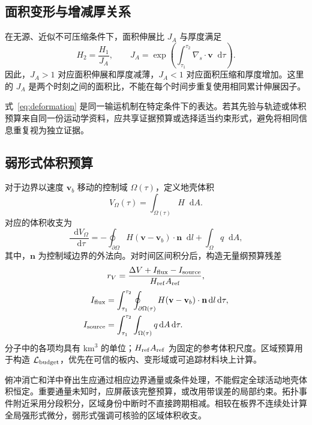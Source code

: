 \documentclass[UTF8,zihao=-4,fontset=none,a4paper]{ctexart}
\newcommand{\dif}{\mathop{}\!\mathrm{d}}
\newcommand{\divs}{\nabla_s\!\cdot}
\newcommand{\loss}{\mathcal{L}}
\begin{document}
\subsection{面积变形与增减厚关系}

在无源、近似不可压缩条件下，面积伸展比 $J_A$ 与厚度满足
\begin{equation}
  H_2=\frac{H_1}{J_A},
  \qquad
  J_A=\exp\!\left(
  \int_{\tau_1}^{\tau_2}\divs\mathbf v\dif\tau
  \right).
  \label{eq:deformation}
\end{equation}
因此，$J_A>1$ 对应面积伸展和厚度减薄，$J_A<1$ 对应面积压缩和厚度增加。这里的 $J_A$ 是两个时刻之间的面积比，不能在每个时间步重复使用相同累计伸展因子。

式~\eqref{eq:deformation} 是同一输运机制在特定条件下的表达。若其先验与轨迹或体积预算来自同一份运动学资料，应共享证据预算或选择适当约束形式，避免将相同信息重复视为独立证据。

\subsection{弱形式体积预算}

对于边界以速度 $\mathbf v_b$ 移动的控制域 $\Omega(\tau)$，定义地壳体积
\begin{equation}
  V_\Omega(\tau)=\int_{\Omega(\tau)}H\dif A.
\end{equation}
对应的体积收支为
\begin{equation}
  \frac{\dif V_\Omega}{\dif\tau}
  =-\oint_{\partial\Omega}
  H(\mathbf v-\mathbf v_b)\cdot\mathbf n\dif l
  +\int_\Omega q\dif A,
  \label{eq:weak-budget}
\end{equation}
其中，$\mathbf n$ 为控制域边界的外法向。对时间区间积分后，构造无量纲预算残差
\begin{equation}
  r_V=
  \frac{\Delta V+I_{\rm flux}-I_{\rm source}}
       {H_{\rm ref}A_{\rm ref}},
  \label{eq:budget-residual}
\end{equation}
\begin{align}
  I_{\rm flux}
  &=\int_{\tau_1}^{\tau_2}
  \oint_{\partial\Omega(\tau)}
  H(\mathbf v-\mathbf v_b)\cdot\mathbf n\dif l\dif\tau,\\
  I_{\rm source}
  &=\int_{\tau_1}^{\tau_2}
  \int_{\Omega(\tau)}q\dif A\dif\tau.
\end{align}
分子中的各项均具有 km$^3$ 的单位；$H_{\rm ref}A_{\rm ref}$ 为固定的参考体积尺度。区域预算用于构造 $\loss_{\rm budget}$，优先在可信的板内、变形域或可追踪材料块上计算。

俯冲消亡和洋中脊出生应通过相应边界通量或条件处理，不能假定全球活动地壳体积恒定。重要通量未知时，应屏蔽该完整预算，或改用带误差的局部约束。拓扑事件附近采用分段积分，区域身份中断时不直接跨期相减。相较在板界不连续处计算全局强形式微分，弱形式强调可核验的区域体积收支。
\end{document}
